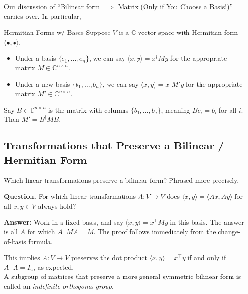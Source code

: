 Our discussion of ``Bilinear form $\implies$ Matrix (Only if You Choose a Basis!)'' carries over.  In particular,

\begin{theorem}{Hermitian Forms w/ Bases}
    Suppose $V$ is a $\mathbb{C}$-vector space with Hermitian form $\langle \bullet, \bullet \rangle$.
    \begin{itemize}
        \item Under a basis $\{e_1, \dots, e_n\}$, we can say $\langle x, y \rangle = x^{\dagger}My$ for the appropriate matrix $M \in \mathbb{C}^{n \times n}$.
        \item Under a new basis $\{b_1, \dots, b_n\}$, we can say $\langle x, y \rangle = x^{\dagger}M'y$ for the appropriate matrix $M' \in \mathbb{C}^{n \times n}$.
    \end{itemize}
    Say $B \in \mathbb{C}^{n \times n}$ is the matrix with columns $\{b_1, \dots, b_n\}$, meaning $Be_i = b_i$ for all $i$. Then $M' = B^{\dagger}MB$.
\end{theorem}





\subsection{Transformations that Preserve a Bilinear / Hermitian Form}

Which linear transformations preserve a bilinear form?  Phrased more precisely,

\textbf{Question:} For which linear transformations $A: V \to V$ does $\langle x, y \rangle = \langle Ax, Ay \rangle$ for all $x, y \in V$ always hold?

\textbf{Answer:} Work in a fixed basis, and say $\langle x, y \rangle = x^{\top}My$ in this basis.  The answer is all $A$ for which $A^{\top}MA = M$.  The proof follows immediately from the change-of-basis formula.

\begin{remark}
    This implies $A: V \to V$ preserves the dot product $\langle x, y \rangle = x^{\top}y$ if and only if $A^{\top}A = I_n$, as expected. \\ A subgroup of matrices that preserve a more general symmetric bilinear form is called an \emph{indefinite orthogonal group}.
\end{remark}

